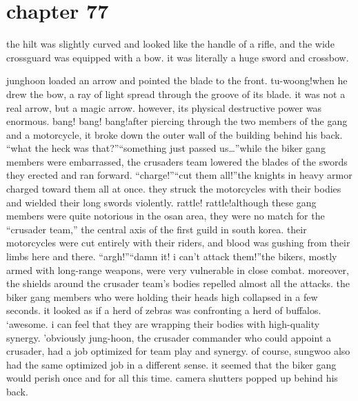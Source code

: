 \section{chapter 77}

                            the hilt was slightly curved and looked like the handle of a rifle, and the wide crossguard was equipped with a bow.
 it was literally a huge sword and crossbow.





junghoon loaded an arrow and pointed the blade to the front.
tu-woong!when he drew the bow, a ray of light spread through the groove of its blade.
 it was not a real arrow, but a magic arrow.
 however, its physical destructive power was enormous.
bang! bang! bang!after piercing through the two members of the gang and a motorcycle, it broke down the outer wall of the building behind his back.
“what the heck was that?”“something just passed us…”while the biker gang members were embarrassed, the crusaders team lowered the blades of the swords they erected and ran forward.
“charge!”“cut them all!”the knights in heavy armor charged toward them all at once.
 they struck the motorcycles with their bodies and wielded their long swords violently.
rattle! rattle!although these gang members were quite notorious in the osan area, they were no match for the “crusader team,” the central axis of the first guild in south korea.
their motorcycles were cut entirely with their riders, and blood was gushing from their limbs here and there.
“argh!”“damn it! i can’t attack them!”the bikers, mostly armed with long-range weapons, were very vulnerable in close combat.
 moreover, the shields around the crusader team’s bodies repelled almost all the attacks.
the biker gang members who were holding their heads high collapsed in a few seconds.
 it looked as if a herd of zebras was confronting a herd of buffalos.
‘awesome.
 i can feel that they are wrapping their bodies with high-quality synergy.
’obviously jung-hoon, the crusader commander who could appoint a crusader, had a job optimized for team play and synergy.
 of course, sungwoo also had the same optimized job in a different sense.
it seemed that the biker gang would perish once and for all this time.
 camera shutters popped up behind his back.

